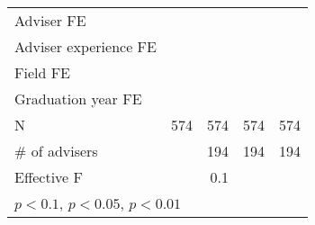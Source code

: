 {\begin{tabular}{l*{4}{D{.}{.}{-1}}}
\addlinespace
Adviser FE                    	&     \checkmark         	&     \checkmark         	&     \checkmark         	&     \checkmark         \\
\addlinespace
Adviser experience FE         	&     \checkmark         	&     \checkmark         	&     \checkmark         	&     \checkmark         \\
\addlinespace
Field FE                      	&     \checkmark         	&     \checkmark         	&     \checkmark         	&     \checkmark         \\
\addlinespace
Graduation year FE            	&     \checkmark         	&     \checkmark         	&     \checkmark         	&     \checkmark         \\
\midrule
N                             	&            574         	&            574         	&            574         	&            574         \\
\# of advisers                	&                        	&            194         	&            194         	&            194         \\
Effective F                   	&                        	&            0.1         	&                        	&                        \\
\bottomrule
{}\\
\end{tabular}
}
